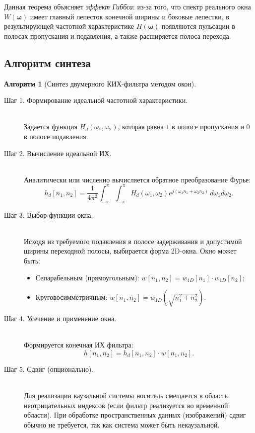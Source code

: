 \documentclass[12pt, a4paper]{article}
\theoremstyle{definition}
\newtheorem{algorithm}{Алгоритм}
\theoremstyle{plain}
\begin{document}
Данная теорема объясняет \textit{эффект Гиббса}: из-за того, что спектр реального окна $W(\bm{\omega})$ имеет главный лепесток конечной ширины и боковые лепестки, в результирующей частотной характеристике $H(\bm{\omega})$ появляются пульсации в полосах пропускания и подавления, а также расширяется полоса перехода.

\subsection{Алгоритм синтеза}

\begin{algorithm}[Синтез двумерного КИХ-фильтра методом окон] \leavevmode
\begin{description}
    \item[Шаг 1. Формирование идеальной частотной характеристики.] \hfill \\
    Задается функция $H_d(\omega_1, \omega_2)$, которая равна $1$ в полосе пропускания и $0$ в полосе подавления.

    \item[Шаг 2. Вычисление идеальной ИХ.] \hfill \\
    Аналитически или численно вычисляется обратное преобразование Фурье:
    \begin{equation}
        h_d[n_1, n_2] = \frac{1}{4\pi^2} \int_{-\pi}^{\pi} \int_{-\pi}^{\pi} H_d(\omega_1, \omega_2) e^{j(\omega_1 n_1 + \omega_2 n_2)} \, d\omega_1 d\omega_2.
    \end{equation}

    \item[Шаг 3. Выбор функции окна.] \hfill \\
    Исходя из требуемого подавления в полосе задерживания и допустимой ширины переходной полосы, выбирается форма 2D-окна. Окно может быть:
    \begin{itemize}
        \item Сепарабельным (прямоугольным): $w[n_1, n_2] = w_{1D}[n_1] \cdot w_{1D}[n_2]$;
        \item Круговосимметричным: $w[n_1, n_2] = w_{1D}(\sqrt{n_1^2 + n_2^2})$.
    \end{itemize}

    \item[Шаг 4. Усечение и применение окна.] \hfill \\
    Формируется конечная ИХ фильтра:
    \begin{equation}
        h[n_1, n_2] = h_d[n_1, n_2] \cdot w[n_1, n_2].
    \end{equation}

    \item[Шаг 5. Сдвиг (опционально).] \hfill \\
    Для реализации каузальной системы носитель смещается в область неотрицательных индексов (если фильтр реализуется во временной области). При обработке пространственных данных (изображений) сдвиг обычно не требуется, так как система может быть некаузальной.
\end{description}
\end{algorithm}
\end{document}
